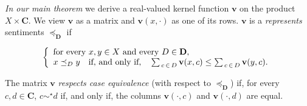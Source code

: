 \documentclass[ecta,nameyear,draft]{econsocart}
\newcommand{\R}{\mathbb R}
\newcommand{\mbbd}{{\mathbf D}}
\newcommand{\mbbc}{{\mathbf C}}
\newcommand{\fourdiv}{\textsc{iv}-\textsc{diversity}}
\theoremstyle{plain}
\newtheorem{observation}{Observation}
\theoremstyle{remark}
\begin{document}
\emph{In our main theorem}\label{sec-main} we derive a real-valued kernel
function $\mathbf{v}$ on the product $X \times \mbbc$. We view $\mathbf{v}$ as
a matrix and $\mathbf{v}(x, \cdot)$ as one of its rows.  $\mathbf{v}$ is a
\emph{represents} sentiments $\preceq_{\mbbd}$ if
\begin{linenomath*} 
  \begin{equation}\notag\label{eq-rep-main} \left\{
      \begin{array}{l} \text{for every $x , y \in X$ and every $D \in
        \mbbd$,}\\
        x \preceq_{D} y \quad \text{if, and only if,} \quad \sum _ {\, c \,\in\, D}
        \mathbf{v}(x, c) \leq \sum_{\, c \,\in\, D} \mathbf{v}(y, c) .
    \end{array}\right.
  \end{equation}
\end{linenomath*}
The matrix $\mathbf{v}$ \emph{respects case equivalence} (with respect to
$\preceq_{\mbbd}$) if, for every $c,d\in \mbbc$, $c \sim^{\star} d$ if, and
only if, the columns $\mathbf{v}(\cdot, c)$ and $\mathbf{v}(\cdot, d)$ are
equal.
\end{document}
